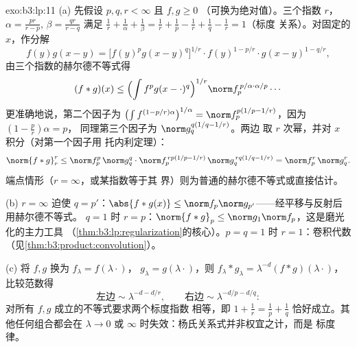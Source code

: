 \begin{solution}{exo:b3:lp:11}
(a) 先假设 $p, q, r < \infty$ 且 $f, g \geq 0$
（可换为绝对值）。三个指数 $r$，
$\alpha = \frac{pr}{r-p}$, $\beta = \frac{qr}{r-q}$
满足 $\frac1r + \frac1\alpha + \frac1\beta = \frac1r +
\frac1p - \frac1r + \frac1q - \frac1r = 1$（标度
关系）。对固定的 $x$，作分解
\[
f(y)g(x-y) = \bigl[f(y)^pg(x-y)^q\bigr]^{1/r}\cdot
f(y)^{1 - p/r}\cdot g(x-y)^{1 - q/r},
\]
由三个指数的赫尔德不等式得
\[
(f*g)(x) \leq \Bigl(\int f^pg(x-\cdot)^q\Bigr)^{1/r}
\norm f_p^{\,p/\alpha\cdot\alpha/p}\cdots
\]
更准确地说，第二个因子为
$\bigl(\int f^{(1-p/r)\alpha}\bigr)^{1/\alpha} =
\norm f_p^{p(1/p - 1/r)}$，因为 $(1 - \frac pr)\alpha = p$，
同理第三个因子为 $\norm g_q^{q(1/q - 1/r)}$。两边
取 $r$ 次幂，并对 $x$ 积分（对第一个因子用
托内利定理）：
\[
\norm{f*g}_r^r \leq \norm f_p^p\,\norm g_q^q\cdot
\norm f_p^{\,rp(1/p - 1/r)}\,\norm g_q^{\,rq(1/q - 1/r)}
= \norm f_p^r\,\norm g_q^r .
\]
端点情形（$r = \infty$，或某指数等于其
界）则为普通的赫尔德不等式或直接估计。

(b) $r = \infty$ 迫使 $q = p'$：$\abs{f*g(x)} \leq \norm
f_p\norm g_{p'}$——经平移与反射后用赫尔德不等式。
$q = 1$ 时 $r = p$：$\norm{f*g}_p \leq \norm
g_1\norm f_p$，这是磨光化的主力工具
（\cref{thm:b3:lp:regularization}的核心）。$p = q = 1$
时 $r = 1$：卷积代数
（见\cref{thm:b3:product:convolution}）。

(c) 将 $f, g$ 换为 $f_\lambda = f(\lambda\cdot)$，
$g_\lambda = g(\lambda\cdot)$，则 $f_\lambda*g_\lambda =
\lambda^{-d}(f*g)(\lambda\cdot)$，比较范数得
\[
\text{左边} \sim \lambda^{-d - d/r}, \qquad
\text{右边} \sim \lambda^{-d/p - d/q} :
\]
对所有 $f, g$ 成立的不等式要求两个标度指数
相等，即 $1 + \frac1r = \frac1p + \frac1q$
恰好成立。其他任何组合都会在 $\lambda \to 0$ 或
$\infty$ 时失效：杨氏关系式并非权宜之计，而是
标度律。
\end{solution}

